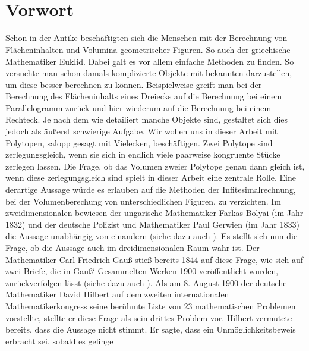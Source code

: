 \documentclass[11pt,titlepage]{article}
\theoremstyle{definition}
\theoremstyle{remark}
\begin{document}
	\newpage \ 
	\thispagestyle{empty}
	\newpage
	\thispagestyle{empty}
	
	\tableofcontents
	
	
	\newpage \
	\thispagestyle{empty} 
	\newpage
	\setcounter{page}{1}
	
	\section*{Vorwort}
	
	Schon in der Antike beschäftigten sich die Menschen mit der Berechnung 
	von Flächeninhalten und Volumina geometrischer Figuren. So auch 
	der griechische Mathematiker Euklid. Dabei galt es vor allem 
	einfache Methoden zu finden. So versuchte man schon damals komplizierte 
	Objekte mit bekannten darzustellen, um diese besser berechnen zu können. 
	Beispielweise greift man bei der Berechnung des Flächeninhalts eines 
	Dreiecks auf die Berechnung bei einem Parallelogramm zurück und hier 
	wiederum auf die Berechnung bei einem Rechteck. Je nach dem wie 
	detailiert manche Objekte sind, gestaltet sich dies jedoch als äußerst 
	schwierige Aufgabe. Wir wollen uns in dieser Arbeit mit Polytopen, 
	salopp gesagt mit Vielecken, beschäftigen. Zwei Polytope sind 
	zerlegungsgleich, wenn sie sich in endlich viele paarweise kongruente 
	Stücke zerlegen lassen. Die Frage, ob das Volumen zweier Polytope genau 
	dann gleich ist, wenn diese zerlegungsgleich sind spielt in dieser 
	Arbeit eine zentrale Rolle. Eine derartige Aussage würde es erlauben 
	auf die Methoden der Infitesimalrechnung, bei der Volumenberechung von 
	unterschiedlichen Figuren, zu verzichten. Im zweidimensionalen 
	bewiesen der ungarische Mathematiker Farkas Bolyai (im Jahr 1832) und 
	der deutsche Polizist und Mathematiker Paul Gerwien (im Jahr 1833) 
	die Aussage unabhängig von einandern (siehe dazu auch \cite{Boltianskii}). 
	Es stellt sich nun die Frage, ob die Aussage auch im dreidimensionalen 
	Raum wahr ist. Der Mathematiker Carl Friedrich Gauß stieß bereits 1844 
	auf diese Frage, wie sich auf zwei Briefe, die in Gauß` Gesammelten Werken 
	1900 veröffentlicht wurden, zurückverfolgen lässt (siehe dazu 
	auch \cite{Proofsfromthebook}). Als am 8. August 1900 der deutsche 
	Mathematiker David Hilbert auf dem zweiten internationalen Mathematikerkongress 
	seine berühmte Liste von 23 mathematischen Problemen vorstellte, stellte 
	er diese Frage als sein drittes Problem vor. Hilbert vermutete bereits, 
	dass die Aussage nicht stimmt. Er sagte, dass ein Unmöglichkeitsbeweis 
	erbracht sei, sobald es gelinge
\end{document}

